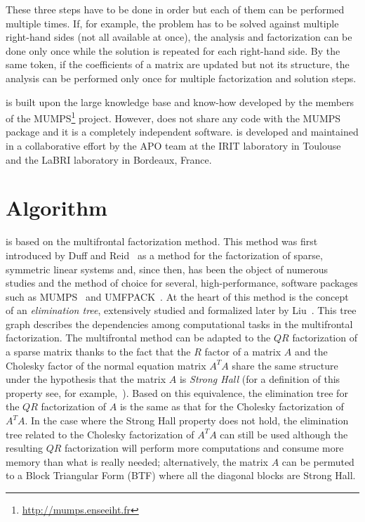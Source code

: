 \documentclass[11pt]{article}
\begin{document}
These three steps have to be done in order but each of them can be
performed multiple times. If, for example, the problem has to be
solved against multiple right-hand sides (not all available at once),
the analysis and factorization can be done only once while the
solution is repeated for each right-hand side. By the same token, if
the coefficients of a matrix are updated but not its structure, the
analysis can be performed only once for multiple factorization and
solution steps.

\qrm is built upon the large knowledge base and know-how developed by
the members of the MUMPS\footnote{\url{http://mumps.enseeiht.fr}}
project. However, \qrm does not share any code with the MUMPS package
and it is a completely independent software. \qrm is developed and
maintained in a collaborative effort by the APO team at the IRIT
laboratory in Toulouse and the LaBRI laboratory in Bordeaux, France.



\section{Algorithm}
\label{sec:algo}

\qrm is based on the multifrontal factorization method. This method
was first introduced by Duff and Reid~\cite{dure:83} as a method for
the factorization of sparse, symmetric linear systems and, since then,
has been the object of numerous studies and the method of choice for
several, high-performance, software packages such as
MUMPS~\cite{adkl:00} and UMFPACK~\cite{davis:04}. At the heart of this
method is the concept of an {\it elimination tree}, extensively
studied and formalized later by Liu~\cite{liu:90}. This tree graph
describes the dependencies among computational tasks in the
multifrontal factorization. The multifrontal method can be adapted to
the $QR$ factorization of a sparse matrix thanks to the fact that the
$R$ factor of a matrix $A$ and the Cholesky factor of the normal
equation matrix $A^TA$ share the same structure under the hypothesis
that the matrix $A$ is {\it Strong Hall} (for a definition of this
property see, for example,~\cite{bjor:96}). Based on this equivalence,
the elimination tree for the $QR$ factorization of $A$ is the same as
that for the Cholesky factorization of $A^TA$. In the case where the
Strong Hall property does not hold, the elimination tree related to
the Cholesky factorization of $A^TA$ can still be used although the
resulting $QR$ factorization will perform more computations and
consume more memory than what is really needed; alternatively, the
matrix $A$ can be permuted to a Block Triangular Form (BTF) where all
the diagonal blocks are Strong Hall.
\end{document}
